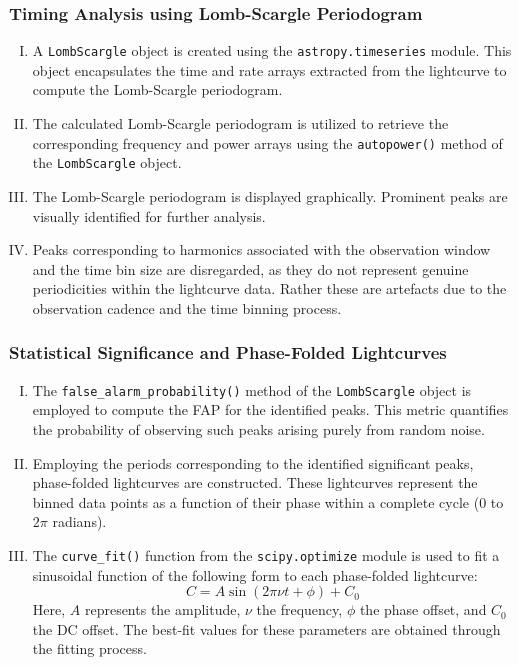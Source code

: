    		\subsubsection{Timing Analysis using Lomb-Scargle Periodogram}
    			\begin{enumerate}[I.]
    				\item A \texttt{LombScargle} object is created using the \texttt{astropy.timeseries} module. This object encapsulates the time and rate arrays extracted from the lightcurve to compute the Lomb-Scargle periodogram.
    				\item The calculated Lomb-Scargle periodogram is utilized to retrieve the corresponding frequency and power arrays using the \texttt{autopower()} method of the \texttt{LombScargle} object.
    				\item The Lomb-Scargle periodogram is displayed graphically. Prominent peaks are visually identified for further analysis.
    				\item Peaks corresponding to harmonics associated with the observation window and the time bin size are disregarded, as they do not represent genuine periodicities within the lightcurve data. Rather these are artefacts due to the observation cadence and the time binning process.
    			\end{enumerate}
    		
    		\subsubsection{Statistical Significance and Phase-Folded Lightcurves}
    			\begin{enumerate}[I.]
    				\item The \texttt{false\_alarm\_probability()} method of the \texttt{LombScargle} object is employed to compute the FAP for the identified peaks. This metric quantifies the probability of observing such peaks arising purely from random noise.
    				\item Employing the periods corresponding to the identified significant peaks, phase-folded lightcurves are constructed. These lightcurves represent the binned data points as a function of their phase within a complete cycle (0 to $2\pi$ radians).
    				\item The \texttt{curve\_fit()} function from the \texttt{scipy.optimize} module is used to fit a sinusoidal function of the following form to each phase-folded lightcurve:
    				$$C=A\sin(2\pi\nu t+\phi)+C_0$$
    				Here, $A$ represents the amplitude, $\nu$ the frequency, $\phi$ the phase offset, and $C_0$ the DC offset. The best-fit values for these parameters are obtained through the fitting process.
    			\end{enumerate}
    		

